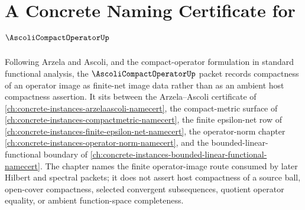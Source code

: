 \chapter{A Concrete Naming Certificate for $\AscoliCompactOperatorUp$}
\label{ch:concrete-instances-ascoli-compact-operator-namecert}

Following Arzela and Ascoli, and the compact-operator formulation in standard functional analysis, the $\AscoliCompactOperatorUp$ packet records compactness of an operator image as finite-net image data rather than as an ambient host compactness assertion. It sits between the Arzela--Ascoli certificate of \autoref{ch:concrete-instances-arzelaascoli-namecert}, the compact-metric surface of \autoref{ch:concrete-instances-compactmetric-namecert}, the finite epsilon-net row of \autoref{ch:concrete-instances-finite-epsilon-net-namecert}, the operator-norm chapter \autoref{ch:concrete-instances-operator-norm-namecert}, and the bounded-linear-functional boundary of \autoref{ch:concrete-instances-bounded-linear-functional-namecert}. The chapter names the finite operator-image route consumed by later Hilbert and spectral packets; it does not assert host compactness of a source ball, open-cover compactness, selected convergent subsequences, quotient operator equality, or ambient function-space completeness.

